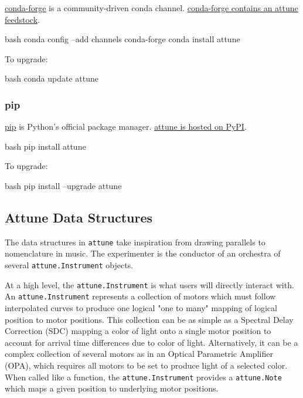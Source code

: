 \href{https://conda-forge.org/}{conda-forge} is a community-driven conda
channel.
\href{https://github.com/conda-forge/attune-feedstock}{conda-forge
contains an attune feedstock}.

\begin{codefragment}{bash}
conda config --add channels conda-forge
conda install attune
\end{codefragment}

To upgrade:

\begin{codefragment}{bash}
conda update attune
\end{codefragment}

\hypertarget{pip}{%
\subsubsection{pip}\label{pip}}

\href{https://pypi.python.org/pypi/pip}{pip} is Python's official
package manager. \href{https://pypi.org/project/attune/}{attune is
hosted on PyPI}.

\begin{codefragment}{bash}
pip install attune
\end{codefragment}

To upgrade:

\begin{codefragment}{bash}
pip install --upgrade attune
\end{codefragment}
\hypertarget{attune-data-structures}{%
\subsection{Attune Data Structures}\label{attune-data-structures}}

The data structures in \texttt{attune} take inspiration from drawing
parallels to nomenclature in music. The experimenter is the conductor of
an orchestra of several \texttt{attune.Instrument}
objects.

At a high level, the \texttt{attune.Instrument} is what
users will directly interact with. An
\texttt{attune.Instrument} represents a collection of
motors which must follow interpolated curves to produce one logical "one
to many" mapping of logical position to motor positions. This collection
can be as simple as a Spectral Delay Correction (SDC) mapping a color of
light onto a single motor position to account for arrival time
differences due to color of light. Alternatively, it can be a complex
collection of several motors as in an Optical Parametric Amplifier
(OPA), which requires all motors to be set to produce light of a
selected color. When called like a function, the
\texttt{attune.Instrument} provides a
\texttt{attune.Note} which maps a given position to
underlying motor positions.


